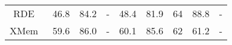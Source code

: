 \begin{table*}[t]
{\begin{tabular}{c|cccc|c|c|c|c}
RDE~\citep{li2022recurrent}                                                       & 46.8                                                & 84.2                                                     & -                                                  & 48.4                                                & 81.9                                                     &      64                                                                     & 88.8  & -            \\
XMem~\citep{cheng2022xmem}                                                      & 59.6                                                & 86.0                                                     & -                                                  & 60.1                                                & 85.6                                                     &     62                                                                      & 61.2  & -            \\

\end{tabular}}
\end{table*}
